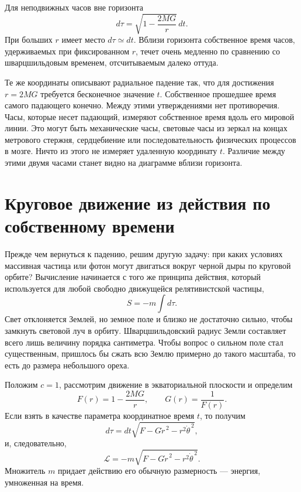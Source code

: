 Для неподвижных часов вне горизонта \begin{equation}
d\tau
=
\sqrt{1-\frac{2MG}{r}}\,dt.
\label{eq:l6-static-clock}
\end{equation} При больших \(r\) имеет место \(d\tau\simeq dt\). Вблизи горизонта собственное время часов, удерживаемых при фиксированном \(r\), течет очень медленно по сравнению со шварцшильдовым временем, отсчитываемым далеко оттуда.

Те же координаты описывают радиальное падение так, что для достижения \(r=2MG\) требуется бесконечное значение \(t\). Собственное прошедшее время самого падающего конечно. Между этими утверждениями нет противоречия. Часы, которые несет падающий, измеряют собственное время вдоль его мировой линии. Это могут быть механические часы, световые часы из зеркал на концах метрового стержня, сердцебиение или последовательность физических процессов в мозге. Ничто из этого не измеряет удаленную координату \(t\). Различие между этими двумя часами станет видно на диаграмме вблизи горизонта.

\section{Круговое движение из действия по собственному времени}

Прежде чем вернуться к падению, решим другую задачу: при каких условиях массивная частица или фотон могут двигаться вокруг черной дыры по круговой орбите? Вычисление начинается с того же принципа действия, который используется для любой свободно движущейся релятивистской частицы, \begin{equation}
S=-m\int d\tau.
\label{eq:l6-particle-action}
\end{equation} Свет отклоняется Землей, но земное поле и близко не достаточно сильно, чтобы замкнуть световой луч в орбиту. Шварцшильдовский радиус Земли составляет всего лишь величину порядка сантиметра. Чтобы вопрос о сильном поле стал существенным, пришлось бы сжать всю Землю примерно до такого масштаба, то есть до размера небольшого ореха.

Положим \(c=1\), рассмотрим движение в экваториальной плоскости и определим \begin{equation}
F(r)=1-\frac{2MG}{r},
\qquad
G(r)=\frac{1}{F(r)}.
\label{eq:l6-fg}
\end{equation} Если взять в качестве параметра координатное время \(t\), то получим \begin{equation}
d\tau
=dt\sqrt{F-G\dot r^{\,2}-r^{2}\dot\theta^{\,2}},
\end{equation} и, следовательно, \begin{equation}
\mathcal L
=
-m\sqrt{F-G\dot r^{\,2}-r^{2}\dot\theta^{\,2}}.
\label{eq:l6-lagrangian}
\end{equation} Множитель \(m\) придает действию его обычную размерность — энергия, умноженная на время.

